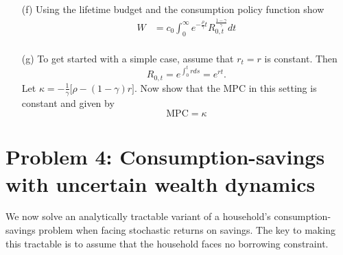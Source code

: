 \documentclass[11pt]{extarticle}
\theoremstyle{plain}
\theoremstyle{definition}
\begin{document}
\begin{enumerate}
\item [(f)] Using the lifetime budget and the consumption policy function show
\begin{align*}
	W &= c_0 \int_0^\infty e^{- \frac{\rho}{\gamma} t} R_{0,t}^\frac{1-\gamma}{\gamma} dt \\
\end{align*}

\item [(g)] To get started with a simple case, assume that $r_t = r$ is constant. Then 
\begin{equation*}
	R_{0,t} = e^{\int_0^t r ds } = e^{ r t}.
\end{equation*}
Let $\kappa =- \frac{1}{\gamma} \big[ \rho - (1-\gamma) r \big] $. Now show that the MPC in this setting is constant and given by
\begin{equation*}
	\text{MPC} = \kappa
\end{equation*}

\end{enumerate}



\vspace{5mm}
\section*{Problem 4: Consumption-savings with uncertain wealth dynamics}

We now solve an analytically tractable variant of a household's consumption-savings problem when facing stochastic returns on savings. The key to making this tractable is to assume that the household faces no borrowing constraint.

\end{document}
